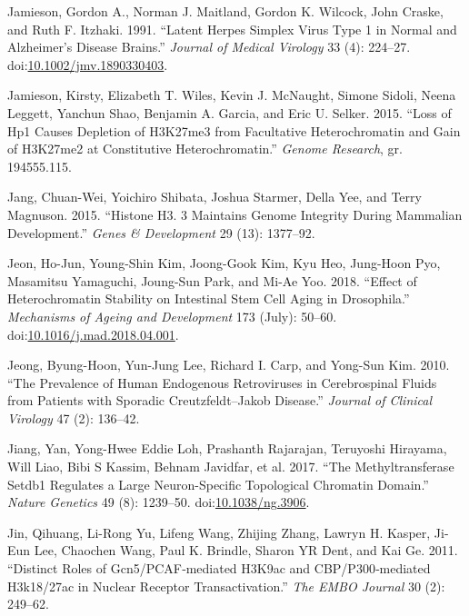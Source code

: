 \documentclass[onehalf,12pt]{beavtex}
\begin{document}
  \hypertarget{ref-JamiesonLatentherpessimplex1991}{}
  Jamieson, Gordon A., Norman J. Maitland, Gordon K. Wilcock, John Craske,
  and Ruth F. Itzhaki. 1991. ``Latent Herpes Simplex Virus Type 1 in
  Normal and Alzheimer's Disease Brains.'' \emph{Journal of Medical
  Virology} 33 (4): 224--27.
  doi:\href{https://doi.org/10.1002/jmv.1890330403}{10.1002/jmv.1890330403}.
  
  \hypertarget{ref-JamiesonLossHP1causes2015}{}
  Jamieson, Kirsty, Elizabeth T. Wiles, Kevin J. McNaught, Simone Sidoli,
  Neena Leggett, Yanchun Shao, Benjamin A. Garcia, and Eric U. Selker.
  2015. ``Loss of Hp1 Causes Depletion of H3K27me3 from Facultative
  Heterochromatin and Gain of H3K27me2 at Constitutive Heterochromatin.''
  \emph{Genome Research}, gr. 194555.115.
  
  \hypertarget{ref-JangHistoneH3maintains2015}{}
  Jang, Chuan-Wei, Yoichiro Shibata, Joshua Starmer, Della Yee, and Terry
  Magnuson. 2015. ``Histone H3. 3 Maintains Genome Integrity During
  Mammalian Development.'' \emph{Genes \& Development} 29 (13): 1377--92.
  
  \hypertarget{ref-JeonEffectheterochromatinstability2018}{}
  Jeon, Ho-Jun, Young-Shin Kim, Joong-Gook Kim, Kyu Heo, Jung-Hoon Pyo,
  Masamitsu Yamaguchi, Joung-Sun Park, and Mi-Ae Yoo. 2018. ``Effect of
  Heterochromatin Stability on Intestinal Stem Cell Aging in Drosophila.''
  \emph{Mechanisms of Ageing and Development} 173 (July): 50--60.
  doi:\href{https://doi.org/10.1016/j.mad.2018.04.001}{10.1016/j.mad.2018.04.001}.
  
  \hypertarget{ref-Jeongprevalencehumanendogenous2010}{}
  Jeong, Byung-Hoon, Yun-Jung Lee, Richard I. Carp, and Yong-Sun Kim.
  2010. ``The Prevalence of Human Endogenous Retroviruses in Cerebrospinal
  Fluids from Patients with Sporadic Creutzfeldt--Jakob Disease.''
  \emph{Journal of Clinical Virology} 47 (2): 136--42.
  
  \hypertarget{ref-JiangmethyltransferaseSETDB1regulates2017}{}
  Jiang, Yan, Yong-Hwee Eddie Loh, Prashanth Rajarajan, Teruyoshi
  Hirayama, Will Liao, Bibi S Kassim, Behnam Javidfar, et al. 2017. ``The
  Methyltransferase Setdb1 Regulates a Large Neuron-Specific Topological
  Chromatin Domain.'' \emph{Nature Genetics} 49 (8): 1239--50.
  doi:\href{https://doi.org/10.1038/ng.3906}{10.1038/ng.3906}.
  
  \hypertarget{ref-JinDistinctrolesGCN52011}{}
  Jin, Qihuang, Li-Rong Yu, Lifeng Wang, Zhijing Zhang, Lawryn H. Kasper,
  Ji-Eun Lee, Chaochen Wang, Paul K. Brindle, Sharon YR Dent, and Kai Ge.
  2011. ``Distinct Roles of Gcn5/PCAF‐mediated H3K9ac and
  CBP/P300‐mediated H3k18/27ac in Nuclear Receptor Transactivation.''
  \emph{The EMBO Journal} 30 (2): 249--62.
  
\end{document}

